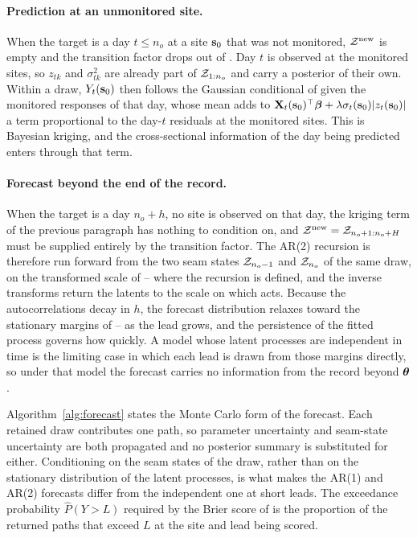 \documentclass[12pt]{article}
\begin{document}
\paragraph{Prediction at an unmonitored site.}
When the target is a day $t \le n_o$ at a site $\mbox{\bf s}_0$ that was not
monitored, ${\cal Z}^{\mathrm{new}}$ is empty and the transition factor drops out
of .  Day $t$ is observed at the monitored sites, so
$z_{tk}$ and $\sigma^2_{tk}$ are already part of ${\cal Z}_{1:n_o}$ and carry a
posterior of their own.  Within a draw, $Y_t(\mbox{\bf s}_0)$ then follows the Gaussian
conditional of  given the monitored responses of that
day, whose mean adds to $\mbox{\bf X}_t(\mbox{\bf s}_0)^\top\mbox{\boldmath $\beta$} + \lambda \sigma_t(\mbox{\bf s}_0)
|z_t(\mbox{\bf s}_0)|$ a term proportional to the day-$t$ residuals at the monitored
sites.  This is Bayesian kriging, and the cross-sectional information of the
day being predicted enters through that term.

\paragraph{Forecast beyond the end of the record.}
When the target is a day $n_o + h$, no site is observed on that day, the
kriging term of the previous paragraph has nothing to condition on, and
${\cal Z}^{\mathrm{new}} = {\cal Z}_{n_o+1:n_o+H}$ must be supplied entirely by the
transition factor.  The AR(2) recursion is therefore run forward from the two
seam states ${\cal Z}_{n_o-1}$ and ${\cal Z}_{n_o}$ of the same draw, on the
transformed scale of -- where the recursion
is defined, and the inverse transforms return the latents to the scale on
which  acts.  Because the autocorrelations
 decay in $h$, the forecast distribution relaxes toward the
stationary margins of -- as the lead grows,
and the persistence of the fitted process governs how quickly.  A model whose
latent processes are independent in time is the limiting case in which each
lead is drawn from those margins directly, so under that model the forecast
carries no information from the record beyond $\mbox{\boldmath $\theta$}$.

Algorithm~\ref{alg:forecast} states the Monte Carlo form of the forecast.  Each
retained draw contributes one path, so parameter uncertainty and seam-state
uncertainty are both propagated and no posterior summary is substituted for
either.  Conditioning on the seam states of the draw, rather than on the
stationary distribution of the latent processes, is what makes the AR(1) and
AR(2) forecasts differ from the independent one at short leads.  The
exceedance probability $\widehat{P}(Y > L)$ required by the Brier score of
 is the proportion of the returned paths that exceed $L$
at the site and lead being scored.
\end{document}
